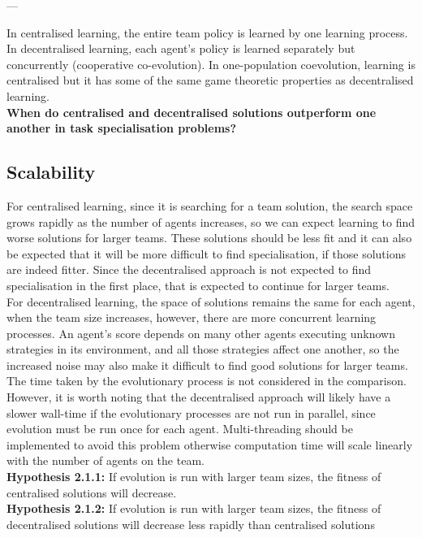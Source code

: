 \documentclass[12pt]{article}
\begin{document}
---

In centralised learning, the entire team policy is learned by one learning process.
In decentralised learning, each agent's policy is learned separately but concurrently (cooperative co-evolution).
In one-population coevolution, learning is centralised but it has some of the same game theoretic properties as decentralised learning.\\

\textbf{When do centralised and decentralised solutions outperform one another in task specialisation problems?}\\

\subsection{Scalability}

For centralised learning, since it is searching for a team solution, the search space grows rapidly as the number of agents increases, so we can expect learning to find worse solutions for larger teams. 
These solutions should be less fit and it can also be expected that it will be more difficult to find specialisation, if those solutions are indeed fitter.
Since the decentralised approach is not expected to find specialisation in the first place, that is expected to continue for larger teams.\\

For decentralised learning, the space of solutions remains the same for each agent, when the team size increases, however, there are more concurrent learning processes. 
An agent’s score depends on many other agents executing unknown strategies in its environment, and all those strategies affect one another, so the increased noise may also make it difficult to find good solutions for larger teams.
The time taken by the evolutionary process is not considered in the comparison.
However, it is worth noting that the decentralised approach will likely have a slower wall-time if the evolutionary processes are not run in parallel, since evolution must be run once for each agent.
Multi-threading should be implemented to avoid this problem otherwise computation time will scale linearly with the number of agents on the team.\\

\textbf{Hypothesis 2.1.1:} If evolution is run with larger team sizes, the fitness of centralised solutions will decrease.\\

\textbf{Hypothesis 2.1.2:} If evolution is run with larger team sizes, the fitness of decentralised solutions will decrease less rapidly than centralised solutions\\
\end{document}
